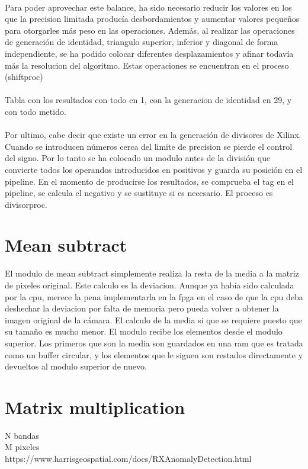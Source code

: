 \\
Para poder aprovechar este balance, ha sido necesario reducir los valores en los que la precision limitada producía desbordamientos y aumentar valores pequeños para otorgarles más peso en las operaciones. Además, al realizar las operaciones de generación de identidad, triangulo superior, inferior y diagonal de forma independiente, se ha podido colocar diferentes desplazamientos y afinar todavía más la resolucion del algoritmo. Estas operaciones se encuentran en el proceso (shiftproc)
\\
\\
Tabla con los resultados con todo en 1, con la generacion de identidad en 29, y con todo metido. 
\\
\\
Por ultimo, cabe decir que existe un error en la generación de divisores de Xilinx. Cuando se introducen números cerca del limite de precision se pierde el control del signo. Por lo tanto se ha colocado un modulo antes de la división que convierte todos los operandos introducidos en positivos y guarda su posición en el pipeline. En el momento de producirse los resultados, se comprueba el tag en el pipeline, se calcula el negativo y se sustituye si es necesario. El proceso es divisorproc.

\section{Mean subtract}
El modulo de mean subtract simplemente realiza la resta de la media a la matriz de pixeles original. Este calculo es la deviacion. Aunque ya había sido calculada por la cpu, merece la pena implementarla en la fpga en el caso de que la cpu deba deshechar la deviacion por falta de memoria pero pueda volver a obtener la imagen original de la cámara. El calculo de la media si que se requiere puesto que su tamaño es mucho menor.
El modulo recibe los elementos desde el modulo superior. Los primeros que son la media son guardados en una ram que es tratada como un buffer circular, y los elementos que le siguen son restados directamente y devueltos al modulo superior de nuevo.


\section{Matrix multiplication}

N bandas\\
M pixeles\\
https://www.harrisgeospatial.com/docs/RXAnomalyDetection.html\\

